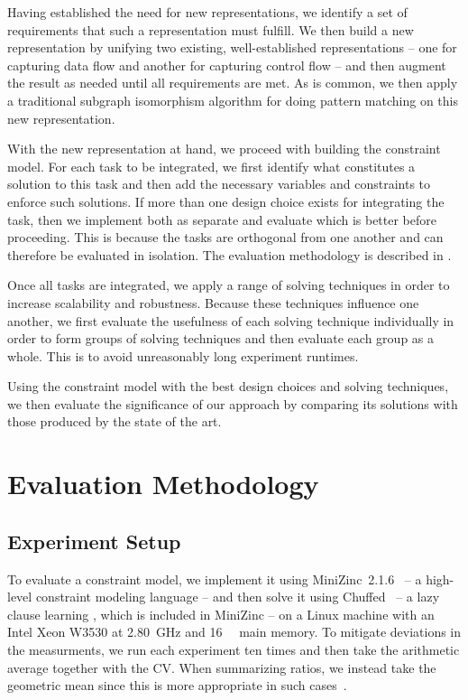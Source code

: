 Having established the need for new representations, we identify a set of
requirements that such a representation must fulfill.
%
We then build a new representation by unifying two existing, well-established
representations -- one for capturing data flow and another for capturing control
flow -- and then augment the result as needed until all requirements are met.
%
As is common, we then apply a traditional \gls{subgraph isomorphism} algorithm
for doing \gls{pattern matching} on this new representation.

With the new representation at hand, we proceed with building the
\gls{constraint model}.
%
For each task to be integrated, we first identify what constitutes a
\gls{solution} to this task and then add the necessary \glspl{variable} and
\glspl{constraint} to enforce such \glspl{solution}.
%
If more than one design choice exists for integrating the task, then we
implement both as separate  and evaluate which is
better before proceeding.
%
This is because the tasks are orthogonal from one another and can therefore be
evaluated in isolation.
%
The evaluation methodology is described in
.

Once all tasks are integrated, we apply a range of solving techniques in order
to increase scalability and robustness.
%
Because these techniques influence one another, we first evaluate the usefulness
of each solving technique individually in order to form groups of solving
techniques and then evaluate each group as a whole.
%
This is to avoid unreasonably long experiment runtimes.

Using the \gls{constraint model} with the best design choices and solving
techniques, we then evaluate the significance of our approach by comparing its
\glspl{solution} with those produced by the state of the art.


\section{Evaluation Methodology}

\subsection{Experiment Setup}

To evaluate a \gls{constraint model}, we implement it using \mbox{\gls{MiniZinc}
  2.1.6}~\cite{NethercoteEtAl:2007} -- a high-level \gls{constraint} modeling
language -- and then solve it using \gls{Chuffed}~\cite{Chu:2011} -- a \gls{lazy
  clause learning} , which is included in
\gls{MiniZinc} -- on a Linux machine with an \gls{Intel} Xeon W3530 at
\SI{2.80}{\GHz} and \SI{16}{\giga\byte} main memory.
%
To mitigate deviations in the measurments, we run each experiment ten times and
then take the arithmetic average together with the \gls{CV}.
%
When summarizing ratios, we instead take the geometric mean since this is more
appropriate in such cases~\cite{FlemingWallace:1986}.


